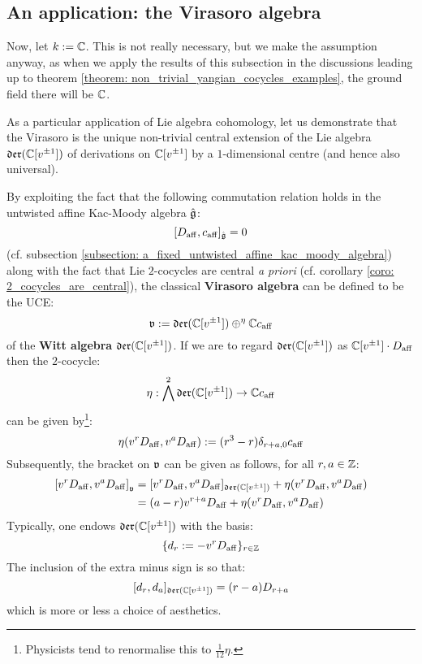     \subsection{An application: the Virasoro algebra} \label{subsection: virasoro_algebra}
        Now, let $k := \mathbb{C}$. This is not really necessary, but we make the assumption anyway, as when we apply the results of this subsection in the discussions leading up to theorem \ref{theorem: non_trivial_yangian_cocycles_examples}, the ground field there will be $\mathbb{C}$.
    
        As a particular application of Lie algebra cohomology, let us demonstrate that the Virasoro is the unique non-trivial central extension of the Lie algebra $\mathfrak{der}(\mathbb{C}[v^{\pm 1}])$ of derivations on $\mathbb{C}[v^{\pm 1}]$ by a $1$-dimensional centre (and hence also universal).
    
        By exploiting the fact that the following commutation relation holds in the untwisted affine Kac-Moody algebra $\hat{\mathfrak{g}}$:
            $$[D_{\mathrm{aff}}, c_{\mathrm{aff}}]_{\hat{\mathfrak{g}}} = 0$$
        (cf. subsection \ref{subsection: a_fixed_untwisted_affine_kac_moody_algebra}) along with the fact that Lie $2$-cocycles are central \textit{a priori} (cf. corollary \ref{coro: 2_cocycles_are_central}), the classical \textbf{Virasoro algebra} can be defined to be the UCE:
            $$\mathfrak{v} := \mathfrak{der}(\mathbb{C}[v^{\pm 1}]) \oplus^{\eta} \mathbb{C} c_{\mathrm{aff}}$$
        of the \textbf{Witt algebra} $\mathfrak{der}(\mathbb{C}[v^{\pm 1}])$. If we are to regard $\mathfrak{der}(\mathbb{C}[v^{\pm 1}])$ as $\mathbb{C}[v^{\pm 1}] \cdot D_{\mathrm{aff}}$ then the $2$-cocycle:
            $$\eta: \bigwedge^2 \mathfrak{der}(\mathbb{C}[v^{\pm 1}]) \to \mathbb{C} c_{\mathrm{aff}}$$
        can be given by\footnote{Physicists tend to renormalise this to $\frac{1}{12} \eta$.}:
            $$\eta(v^r D_{\mathrm{aff}}, v^a D_{\mathrm{aff}}) := (r^3 - r) \delta_{r + a, 0} c_{\mathrm{aff}}$$
        Subsequently, the bracket on $\mathfrak{v}$ can be given as follows, for all $r, a \in \mathbb{Z}$:
            $$
                \begin{aligned}
                    \left[ v^r D_{\mathrm{aff}}, v^a D_{\mathrm{aff}} \right]_{\mathfrak{v}} & = [ v^r D_{\mathrm{aff}}, v^a D_{\mathrm{aff}} ]_{\mathfrak{der}(\mathbb{C}[v^{\pm 1}])} + \eta(v^r D_{\mathrm{aff}}, v^a D_{\mathrm{aff}})
                    \\
                    & = (a - r) v^{r + a} D_{\mathrm{aff}} + \eta(v^r D_{\mathrm{aff}}, v^a D_{\mathrm{aff}})
                \end{aligned}
            $$
        Typically, one endows $\mathfrak{der}(\mathbb{C}[v^{\pm 1}])$ with the basis:
            $$\{ d_r := -v^r D_{\mathrm{aff}} \}_{r \in \mathbb{Z}}$$
        The inclusion of the extra minus sign is so that:
            $$[d_r, d_a]_{\mathfrak{der}(\mathbb{C}[v^{\pm 1}])} = (r - a) D_{r + a}$$
        which is more or less a choice of aesthetics.
    
